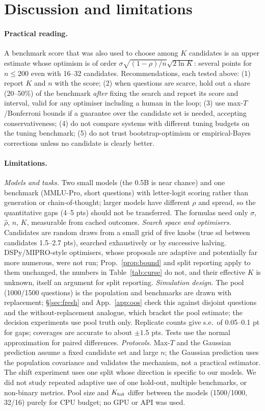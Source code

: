 \section{Discussion and limitations}\label{sec:limits}
\paragraph{Practical reading.}
A benchmark score that was also used to choose among $K$ candidates is an upper estimate whose optimism is of order $\sigma\sqrt{(1-\rho)/n}\sqrt{2\ln K}$: several points for $n\le200$ even with 16--32 candidates. Recommendations, each tested above: (1) report $K$ and $n$ with the score; (2) when questions are scarce, hold out a share (20--50\%) of the benchmark \emph{after} fixing the search and report its score and interval, valid for any optimiser including a human in the loop; (3) use max-$T$/Bonferroni bounds if a guarantee over the candidate set is needed, accepting conservativeness; (4) do not compare systems with different tuning budgets on the tuning benchmark; (5) do not trust bootstrap-optimism or empirical-Bayes corrections unless no candidate is clearly better.

\paragraph{Limitations.}
\emph{Models and tasks.} Two small models (the 0.5B is near chance) and one benchmark (MMLU-Pro, short questions) with letter-logit scoring rather than generation or chain-of-thought; larger models have different $\rho$ and spread, so the quantitative gaps (4--5 pts) should not be transferred. The formulas need only $\sigma$, $\hat\rho$, $n$, $K$, measurable from cached outcomes.
\emph{Search space and optimisers.} Candidates are random draws from a small grid of five knobs (true sd between candidates 1.5--2.7 pts), searched exhaustively or by successive halving. DSPy/MIPRO-style optimisers, whose proposals are adaptive and potentially far more numerous, were not run; Prop.~\ref{prop:bound} and split reporting apply to them unchanged, the numbers in Table~\ref{tab:curse} do not, and their effective $K$ is unknown, itself an argument for split reporting.
\emph{Simulation design.} The pool (1000/1500 questions) is the population and benchmarks are drawn with replacement; \S\ref{sec:fresh} and App.~\ref{app:oos} check this against disjoint questions and the without-replacement analogue, which bracket the pool estimate; the decision experiments use pool truth only. Replicate counts give s.e.\ of 0.05--0.1 pt for gaps; coverages are accurate to about $\pm1.5$ pts. Tests use the normal approximation for paired differences.
\emph{Protocols.} Max-$T$ and the Gaussian prediction assume a fixed candidate set and large $n$; the Gaussian prediction uses the population covariance and validates the mechanism, not a practical estimator. The shift experiment uses one split whose direction is specific to our models. We did not study repeated adaptive use of one hold-out, multiple benchmarks, or non-binary metrics. Pool size and $K_{\rm tot}$ differ between the models (1500/1000, 32/16) purely for CPU budget; no GPU or API was used.

